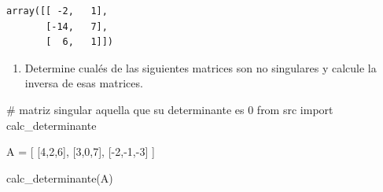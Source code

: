 \documentclass[
  letterpaper,
  DIV=11,
  numbers=noendperiod]{scrartcl}
\newenvironment{Shaded}{\begin{snugshade}}{\end{snugshade}}
\newcommand{\CommentTok}[1]{\textcolor[rgb]{0.37,0.37,0.37}{#1}}
\newcommand{\DecValTok}[1]{\textcolor[rgb]{0.68,0.00,0.00}{#1}}
\newcommand{\ImportTok}[1]{\textcolor[rgb]{0.00,0.46,0.62}{#1}}
\newcommand{\NormalTok}[1]{\textcolor[rgb]{0.00,0.23,0.31}{#1}}
\newcommand{\OperatorTok}[1]{\textcolor[rgb]{0.37,0.37,0.37}{#1}}
\providecommand{\tightlist}{%
  \setlength{\itemsep}{0pt}\setlength{\parskip}{0pt}}\usepackage{longtable,booktabs,array}
\begin{document}
\begin{verbatim}
array([[ -2,   1],
       [-14,   7],
       [  6,   1]])
\end{verbatim}

\begin{enumerate}
\def\labelenumi{\arabic{enumi}.}
\setcounter{enumi}{1}
\tightlist
\item
  Determine cualés de las siguientes matrices son no singulares y
  calcule la inversa de esas matrices.
\end{enumerate}

\begin{Shaded}
\begin{Highlighting}[]
\CommentTok{\# matriz singular aquella que su determinante es 0}
\ImportTok{from}\NormalTok{ src }\ImportTok{import}\NormalTok{ calc\_determinante}

\NormalTok{A }\OperatorTok{=}\NormalTok{ [}
\NormalTok{    [}\DecValTok{4}\NormalTok{,}\DecValTok{2}\NormalTok{,}\DecValTok{6}\NormalTok{],}
\NormalTok{    [}\DecValTok{3}\NormalTok{,}\DecValTok{0}\NormalTok{,}\DecValTok{7}\NormalTok{],}
\NormalTok{    [}\OperatorTok{{-}}\DecValTok{2}\NormalTok{,}\OperatorTok{{-}}\DecValTok{1}\NormalTok{,}\OperatorTok{{-}}\DecValTok{3}\NormalTok{]}
\NormalTok{]}

\NormalTok{calc\_determinante(A)}
\end{Highlighting}
\end{Shaded}
\end{document}
